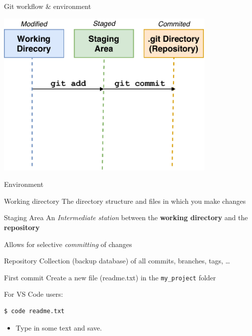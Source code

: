 \documentclass[
  11pt,
  american,
  ignorenonframetext,
  aspectratio=43,
  compress,
  xcolor=dvipsnames]{beamer}
\providecommand{\tightlist}{%
  \setlength{\itemsep}{0pt}\setlength{\parskip}{0pt}}
\begin{document}
\begin{frame}{Git workflow \& environment}
\protect\hypertarget{git-workflow-environment}{}
\begin{center}
\includegraphics[width=0.8\textwidth]{./images/git_workflow.pdf}
\end{center}
\end{frame}

\begin{frame}{Environment}
\protect\hypertarget{environment}{}
\begin{block}{Working directory}
\protect\hypertarget{working-directory}{}
The directory structure and files in which you make changes
\end{block}

\begin{block}{Staging Area}
\protect\hypertarget{staging-area}{}
An \emph{Intermediate station} between the \textbf{working directory}
and the \textbf{repository}

Allows for selective \emph{committing} of changes
\end{block}

\begin{block}{Repository}
\protect\hypertarget{repository}{}
Collection (backup database) of all commits, branches, tags, \ldots{}
\end{block}
\end{frame}

\begin{frame}[fragile]{First commit}
\protect\hypertarget{first-commit}{}
Create a new file (readme.txt) in the \texttt{my\_project} folder

For VS Code users:

\begin{verbatim}
$ code readme.txt
\end{verbatim}

\begin{itemize}
\tightlist
\item
  Type in some text and save.
\end{itemize}
\end{frame}
\end{document}
